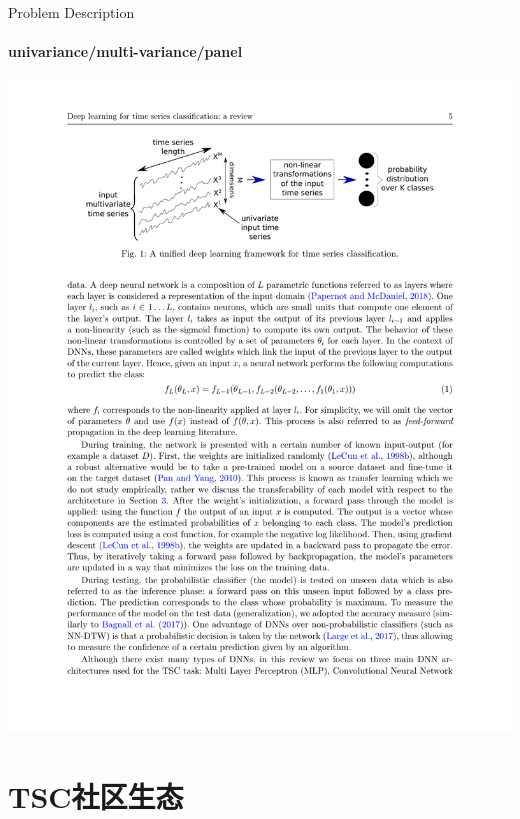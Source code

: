 \documentclass{ctexbeamer}
\begin{document}
\begin{frame}{Problem Description}
	\framesubtitle{univariance/multi-variance/panel}
	\begin{center}
		\includegraphics[width=\textwidth]{figure/base_formula}
	\end{center}
\end{frame}

\section{TSC社区生态}
\end{document}
